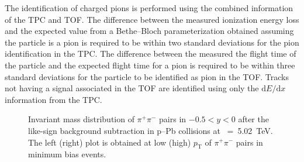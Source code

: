The identification of charged pions is performed using the combined information of the TPC and TOF. The difference between the measured ionization energy loss and the expected value from a Bethe--Bloch parameterization obtained assuming the particle is a pion is required to be within two standard deviations for the pion identification in the TPC. The difference between the measured the flight time of the particle and the expected flight time for a pion is required to be within three standard deviations for the particle to be identified as pion in the TOF. Tracks not having a signal associated in the TOF are identified using only the $\mathrm{d}E/\mathrm{d}x$ information from the TPC.

\label{sec:ana}
\begin{figure}[hbt!]
	\centering
	\caption{ Invariant mass distribution of $\pi^{+}\pi^{-}$ pairs in $-0.5<y<0$ after the like-sign background subtraction in p--Pb collisions at \snn~=~5.02~TeV. The left (right) plot is obtained at low (high) $p_{\mathrm{T}}$ of $\pi^{+}\pi^{-}$ pairs in minimum bias events. }
	\label{fig:SigExt}
\end{figure}

